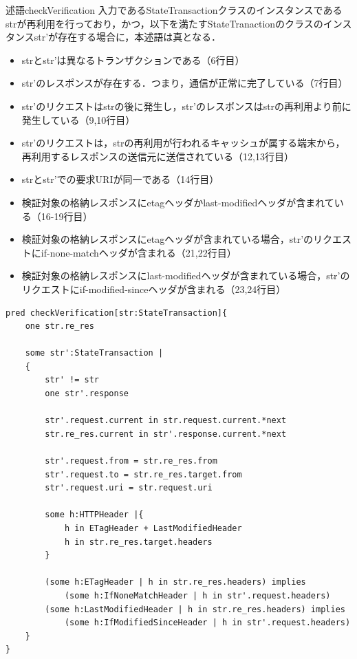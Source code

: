 \documentclass[12pt,a4paper]{jbook}
\begin{document}
\begin{itembox}[l]{述語checkVerification}
入力であるStateTransactionクラスのインスタンスであるstrが再利用を行っており，かつ，以下を満たすStateTranactionのクラスのインスタンスstr'が存在する場合に，本述語は真となる．
\begin{itemize}
\item strとstr'は異なるトランザクションである（6行目）
\item str'のレスポンスが存在する．つまり，通信が正常に完了している（7行目）
\item str'のリクエストはstrの後に発生し，str'のレスポンスはstrの再利用より前に発生している（9,10行目）
\item str'のリクエストは，strの再利用が行われるキャッシュが属する端末から，再利用するレスポンスの送信元に送信されている（12,13行目）
\item strとstr'での要求URIが同一である（14行目）
\item 検証対象の格納レスポンスにetagヘッダかlast-modifiedヘッダが含まれている（16-19行目）
\item 検証対象の格納レスポンスにetagヘッダが含まれている場合，str'のリクエストにif-none-matchヘッダが含まれる（21,22行目）
\item 検証対象の格納レスポンスにlast-modifiedヘッダが含まれている場合，str'のリクエストにif-modified-sinceヘッダが含まれる（23,24行目）
\end{itemize}
\end{itembox}

\begin{lstlisting}[caption=ある再利用が検証済みか判定する述語, label=code:checkVerification]
pred checkVerification[str:StateTransaction]{
	one str.re_res

	some str':StateTransaction |
	{
		str' != str
		one str'.response

		str'.request.current in str.request.current.*next
		str.re_res.current in str'.response.current.*next

		str'.request.from = str.re_res.from
		str'.request.to = str.re_res.target.from
		str'.request.uri = str.request.uri

		some h:HTTPHeader |{
			h in ETagHeader + LastModifiedHeader
			h in str.re_res.target.headers
		}

		(some h:ETagHeader | h in str.re_res.headers) implies
			(some h:IfNoneMatchHeader | h in str'.request.headers)
		(some h:LastModifiedHeader | h in str.re_res.headers) implies
			(some h:IfModifiedSinceHeader | h in str'.request.headers)
	}
}
\end{lstlisting}
\end{document}
